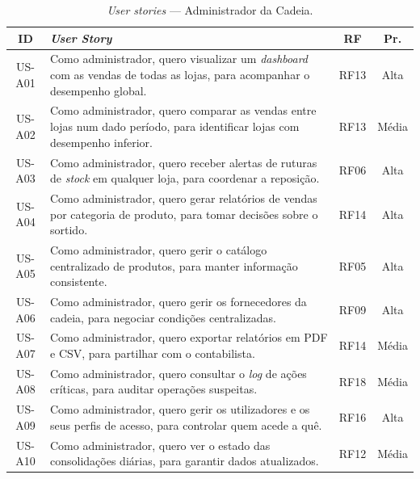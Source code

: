     \begin{table}[H]
    \centering
    \small
    \begin{tabular}{|c|p{8.5cm}|c|c|}
    \hline
    \textbf{ID} & \textbf{\textit{User Story}} & \textbf{RF} & \textbf{Pr.} \\
    \hline
    US-A01 & Como administrador, quero visualizar um \textit{dashboard} com as vendas de todas as lojas, para acompanhar o desempenho global. & RF13 & Alta \\
    \hline
    US-A02 & Como administrador, quero comparar as vendas entre lojas num dado período, para identificar lojas com desempenho inferior. & RF13 & Média \\
    \hline
    US-A03 & Como administrador, quero receber alertas de ruturas de \textit{stock} em qualquer loja, para coordenar a reposição. & RF06 & Alta \\
    \hline
    US-A04 & Como administrador, quero gerar relatórios de vendas por categoria de produto, para tomar decisões sobre o sortido. & RF14 & Alta \\
    \hline
    US-A05 & Como administrador, quero gerir o catálogo centralizado de produtos, para manter informação consistente. & RF05 & Alta \\
    \hline
    US-A06 & Como administrador, quero gerir os fornecedores da cadeia, para negociar condições centralizadas. & RF09 & Alta \\
    \hline
    US-A07 & Como administrador, quero exportar relatórios em PDF e CSV, para partilhar com o contabilista. & RF14 & Média \\
    \hline
    US-A08 & Como administrador, quero consultar o \textit{log} de ações críticas, para auditar operações suspeitas. & RF18 & Média \\
    \hline
    US-A09 & Como administrador, quero gerir os utilizadores e os seus perfis de acesso, para controlar quem acede a quê. & RF16 & Alta \\
    \hline
    US-A10 & Como administrador, quero ver o estado das consolidações diárias, para garantir dados atualizados. & RF12 & Média \\
    \hline
    \end{tabular}
    \caption{\textit{User stories} --- Administrador da Cadeia.}
    \label{tab:us_admin}
    \end{table}

